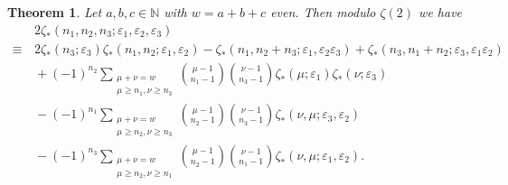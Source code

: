 \documentclass{article}
\newcommand\eps{{\varepsilon}}
\newcommand{\N}{\mathbb{N}}
\theoremstyle{plain}
\newtheorem{thm}{Theorem}[section]
\theoremstyle{definition}
\begin{document}
\begin{thm}\label{thm:PanzerDivES}
Let $a,b,c\in\N$ with $w=a+b+c$ even. Then modulo $\zeta(2)$ we have
\begin{align*}
&\,  2 \zeta_*(n_1,n_2,n_3;\eps_1,\eps_2,\eps_3) \\
\equiv &\,2\zeta_*(n_3;\eps_3)\zeta_*(n_1,n_2;\eps_1,\eps_2)-\zeta_*(n_1,n_2+n_3;\eps_1,\eps_2\eps_3)+\zeta_*(n_3,n_1+n_2;\eps_3,\eps_1\eps_2) \\
&\, +(-1)^{n_2} \sum_{\substack{\mu+\nu=w\\ \mu\ge n_1,\nu\ge n_3}} \binom{\mu-1}{n_1-1} \binom{\nu-1}{n_3-1} \zeta_*(\mu;\eps_1) \zeta_*(\nu;\eps_3) \\
&\, -(-1)^{n_1}\sum_{\substack{\mu+\nu=w\\ \mu\ge n_2,\nu\ge n_3}}  \binom{\mu-1}{n_2-1} \binom{\nu-1}{n_3-1} \zeta_*(\nu,\mu;\eps_3,\eps_2)    \\
&\, -(-1)^{n_3}\sum_{\substack{\mu+\nu=w\\ \mu\ge n_2,\nu\ge n_1}}  \binom{\mu-1}{n_2-1} \binom{\nu-1}{n_1-1} \zeta_*(\nu,\mu;\eps_1,\eps_2) .
\end{align*}
\end{thm}
\end{document}
